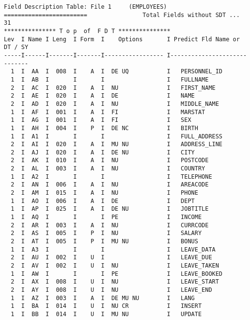 \begin{verbatim}
Field Description Table: File 1     (EMPLOYEES)                              
========================                Total Fields without SDT ... 31      
*************** T o p  of  F D T ***************                             
Lev  I Name I Leng  I Form  I    Options       I Predict Fld Name or DT / SY 
-----I------I-------I-------I----------------- I-----------------------------
  1  I  AA  I  008  I    A  I  DE UQ           I   PERSONNEL_ID              
  1  I  AB  I       I       I                  I   FULLNAME                  
  2  I  AC  I  020  I    A  I  NU              I   FIRST_NAME                
  2  I  AE  I  020  I    A  I  DE              I   NAME                      
  2  I  AD  I  020  I    A  I  NU              I   MIDDLE_NAME               
  1  I  AF  I  001  I    A  I  FI              I   MARSTAT                   
  1  I  AG  I  001  I    A  I  FI              I   SEX                       
  1  I  AH  I  004  I    P  I  DE NC           I   BIRTH                     
  1  I  A1  I       I       I                  I   FULL_ADDRESS              
  2  I  AI  I  020  I    A  I  MU NU           I   ADDRESS_LINE              
  2  I  AJ  I  020  I    A  I  DE NU           I   CITY                      
  2  I  AK  I  010  I    A  I  NU              I   POSTCODE                  
  2  I  AL  I  003  I    A  I  NU              I   COUNTRY                   
  1  I  A2  I       I       I                  I   TELEPHONE                 
  2  I  AN  I  006  I    A  I  NU              I   AREACODE                  
  2  I  AM  I  015  I    A  I  NU              I   PHONE                     
  1  I  AO  I  006  I    A  I  DE              I   DEPT                      
  1  I  AP  I  025  I    A  I  DE NU           I   JOBTITLE                  
  1  I  AQ  I       I       I  PE              I   INCOME                    
  2  I  AR  I  003  I    A  I  NU              I   CURRCODE                  
  2  I  AS  I  005  I    P  I  NU              I   SALARY                    
  2  I  AT  I  005  I    P  I  MU NU           I   BONUS                     
  1  I  A3  I       I       I                  I   LEAVE_DATA                
  2  I  AU  I  002  I    U  I                  I   LEAVE_DUE
  2  I  AV  I  002  I    U  I  NU              I   LEAVE_TAKEN               
  1  I  AW  I       I       I  PE              I   LEAVE_BOOKED              
  2  I  AX  I  008  I    U  I  NU              I   LEAVE_START               
  2  I  AY  I  008  I    U  I  NU              I   LEAVE_END                 
  1  I  AZ  I  003  I    A  I  DE MU NU        I   LANG                      
  1  I  BA  I  014  I    U  I  NU CR           I   INSERT                    
  1  I  BB  I  014  I    U  I  MU NU           I   UPDATE                    
\end{verbatim}


